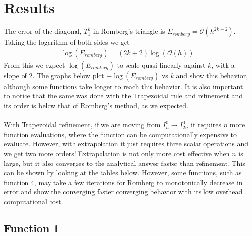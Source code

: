 \documentclass[12pt]{article}
\theoremstyle{remark}
\begin{document}
\section{Results}  

The error of the diagonal, $T_1^k$ in Romberg's triangle is $E_{romberg} = \mathcal{O}(h^{2k+2})$. Taking the logarithm of both sides we get
\begin{align}
	\log(E_{romberg}) = (2k+2)\log(\mathcal{O}(h))
\end{align}
From this we expect $\log(E_{romberg})$ to scale quasi-linearly against $k$, with a slope of 2. The graphs below plot $-\log(E_{romberg})$ vs $k$ and show this behavior, although some functions take longer to reach this behavior. It is also important to notice that the same was done with the Trapezoidal rule and refinement and its order is below that of Romberg's method, as we expected. \\ \\

With Trapezoidal refinement, if we are moving from $I_n^0 \rightarrow I_{2n}^0$ it requires $n$ more function evaluations, where the function can be computationally expensive to evaluate. However, with extrapolation it just requires three scalar operations and we get two more orders! Extrapolation is not only more cost effective when $n$ is large, but it also converges to the analytical answer faster than refinement. This can be shown by looking at the tables below. However, some functions, such as function 4, may take a few iterations for Romberg to monotonically decrease in error and show the converging faster converging behavior with its low overhead computational cost. 

\newpage

\subsection{Function 1}
\end{document}
